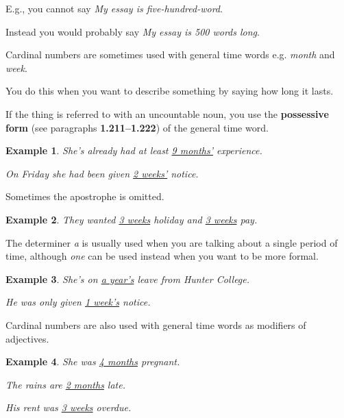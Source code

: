 \documentclass[oneside]{book}
\numberwithin{equation}{section}
\newtheorem{example}{Example}[section]
\begin{document}
E.g., you cannot say \textit{My essay is five-hundred-word}.

Instead you would probably say \textit{My essay is 500 words long}.

%
\noindent{} Cardinal numbers are sometimes used with general time words e.g. \textit{month} and \textit{week}.

You do this when you want to describe something by saying how long it lasts.

If the thing is referred to with an uncountable noun, you use the \textbf{possessive form} (see paragraphs \textbf{1.211--1.222}) of the general time word.
\begin{example}
    She's already had at least \underline{9 months'} experience.
    
    On Friday she had been given \underline{2 weeks'} notice.
\end{example}
Sometimes the apostrophe is omitted.
\begin{example}
    They wanted \underline{3 weeks} holiday and \underline{3 weeks} pay.
\end{example}
The determiner \textit{a} is usually used when you are talking about a single period of time, although \textit{one} can be used instead when you want to be more formal.
\begin{example}
    She's on \underline{a year's} leave from Hunter College.
    
    He was only given \underline{1 week's} notice.
\end{example}
Cardinal numbers are also used with general time words as modifiers of adjectives.
\begin{example}
    She was \underline{4 months} pregnant.
    
    The rains are \underline{2 months} late.
    
    His rent was \underline{3 weeks} overdue.
\end{example}
\end{document}
